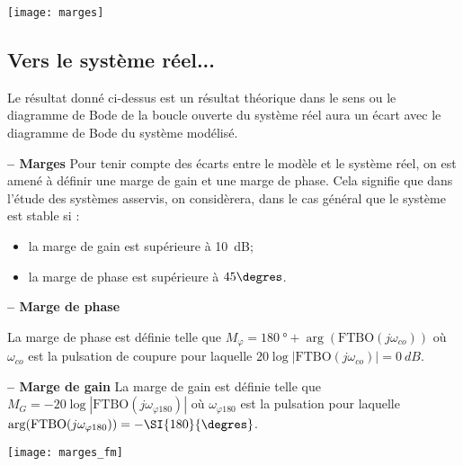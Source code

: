  
\begin{center}
\texttt{[image: marges]}
\end{center} 
\subsection{Vers le système réel...}

Le résultat donné ci-dessus est un résultat théorique dans le sens ou le diagramme de Bode de la boucle ouverte du système réel aura un écart avec le diagramme de Bode du système modélisé. 


\begin{resultat}\textbf{ -- Marges}
Pour tenir compte des écarts entre le modèle et le système réel, on est amené à définir une marge de gain et une marge de phase. Cela signifie que dans l'étude des systèmes asservis, on considèrera, dans le cas général que le système est stable si :
\begin{itemize}
\item la marge de gain est supérieure à \SI{10}{dB};
\item la marge de phase est supérieure à $45\degres$.
\end{itemize}
\end{resultat}

\begin{minipage}[c]{.58\linewidth}
\begin{defi}\textbf{ -- Marge de phase}

La marge de phase est définie telle que $M_\varphi= \SI{180}{\degree} + \arg\left(\text{FTBO}(j\omega_{co})\right)$ où $\omega_{co}$ est la pulsation de coupure pour laquelle $20\log|\text{FTBO}\left(j\omega_{co}\right)|=\SI{0}{dB}$.
\end{defi}

\begin{defi}\textbf{ -- Marge de gain}
La marge de gain est définie telle
que $M_G = -20\log|\text{FTBO} (j\omega_{\varphi 180})|$
où $\omega_{\varphi 180}$ est la pulsation pour laquelle $\arg(\text{FTBO}(j\omega_{ \varphi 180}))= -\SI{180}{\degres}$.
\end{defi}
\end{minipage}\hfill
\begin{minipage}[c]{.4\linewidth}
\begin{center}
\texttt{[image: marges\_fm]}
\end{center}
\end{minipage}


